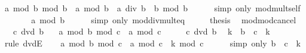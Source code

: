 \begin{isabellebody}
\ {\isachardoublequoteopen}a\ mod\ b\ mod\ b\ {\isacharequal}{\kern0pt}\ {\isacharparenleft}{\kern0pt}a\ mod\ b\ {\isacharplus}{\kern0pt}\ a\ div\ b\ {\isacharasterisk}{\kern0pt}\ b{\isacharparenright}{\kern0pt}\ mod\ b{\isachardoublequoteclose}\isanewline
\ \ \ \ \isamarkupfalse%
\ {\isacharparenleft}{\kern0pt}simp\ only{\isacharcolon}{\kern0pt}\ mod{\isacharunderscore}{\kern0pt}mult{\isacharunderscore}{\kern0pt}self{}{\isacharparenright}{\kern0pt}\isanewline
\ \ \isamarkupfalse%
\ \isamarkupfalse%
\ {\isachardoublequoteopen}{\isasymdots}\ {\isacharequal}{\kern0pt}\ a\ mod\ b{\isachardoublequoteclose}\isanewline
\ \ \ \ \isamarkupfalse%
\ {\isacharparenleft}{\kern0pt}simp\ only{\isacharcolon}{\kern0pt}\ mod{\isacharunderscore}{\kern0pt}div{\isacharunderscore}{\kern0pt}mult{\isacharunderscore}{\kern0pt}eq{\isacharparenright}{\kern0pt}\isanewline
\ \ \isamarkupfalse%
\ \isamarkupfalse%
\ {\isacharquery}{\kern0pt}thesis\ \isacommand{{\isachardot}{\kern0pt}}\isamarkupfalse%
\isanewline
{}\isamarkupfalse%
%
\endisatagproof
{\isafoldproof}%
%
\isadelimproof
\isanewline
%
\endisadelimproof
\isanewline
{}\isamarkupfalse%
\ mod{\isacharunderscore}{\kern0pt}mod{\isacharunderscore}{\kern0pt}cancel{\isacharcolon}{\kern0pt}\isanewline
\ \ \ {\isachardoublequoteopen}c\ dvd\ b{\isachardoublequoteclose}\isanewline
\ \ \ {\isachardoublequoteopen}a\ mod\ b\ mod\ c\ {\isacharequal}{\kern0pt}\ a\ mod\ c{\isachardoublequoteclose}\isanewline
%
\isadelimproof
%
\endisadelimproof
%
\isatagproof
{}\isamarkupfalse%
\ {\isacharminus}{\kern0pt}\isanewline
\ \ \isamarkupfalse%
\ {\isacartoucheopen}c\ dvd\ b{\isacartoucheclose}\ \isamarkupfalse%
\ k\ \ {\isachardoublequoteopen}b\ {\isacharequal}{\kern0pt}\ c\ {\isacharasterisk}{\kern0pt}\ k{\isachardoublequoteclose}\isanewline
\ \ \ \ \isamarkupfalse%
\ {\isacharparenleft}{\kern0pt}rule\ dvdE{\isacharparenright}{\kern0pt}\isanewline
\ \ \isamarkupfalse%
\ {\isachardoublequoteopen}a\ mod\ b\ mod\ c\ {\isacharequal}{\kern0pt}\ a\ mod\ {\isacharparenleft}{\kern0pt}c\ {\isacharasterisk}{\kern0pt}\ k{\isacharparenright}{\kern0pt}\ mod\ c{\isachardoublequoteclose}\isanewline
\ \ \ \ \isamarkupfalse%
\ {\isacharparenleft}{\kern0pt}simp\ only{\isacharcolon}{\kern0pt}\ {\isacartoucheopen}b\ {\isacharequal}{\kern0pt}\ c\ {\isacharasterisk}{\kern0pt}\ k{\isacartoucheclose}{\isacharparenright}{\kern0pt}\isanewline

\end{isabellebody}
